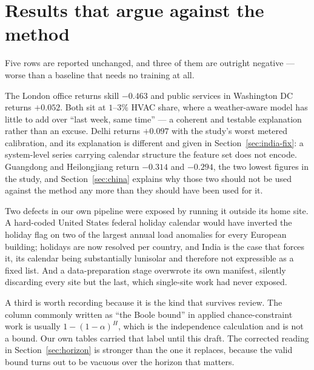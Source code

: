 \section{Results that argue against the method}
\label{sec:against}

Five rows are reported unchanged, and three of them are outright negative ---
worse than a baseline that needs no training at all.

The London office returns skill $-0.463$ and public services in Washington DC
returns $+0.052$. Both sit at $1$--$3\%$ HVAC share, where a weather-aware model
has little to add over ``last week, same time'' --- a coherent and testable
explanation rather than an excuse. Delhi returns $+0.097$ with the study's worst
metered calibration, and its explanation is different and given in
Section~\ref{sec:india-fix}: a system-level series carrying calendar structure
the feature set does not encode. Guangdong and Heilongjiang return $-0.314$ and
$-0.294$, the two lowest figures in the study, and Section~\ref{sec:china}
explains why those two should not be used against the method any more than they
should have been used for it.

Two defects in our own pipeline were exposed by running it outside its home
site. A hard-coded United States federal holiday calendar would have inverted
the holiday flag on two of the largest annual load anomalies for every European
building; holidays are now resolved per country, and India is the case that
forces it, its calendar being substantially lunisolar and therefore not
expressible as a fixed list. And a data-preparation stage overwrote its own
manifest, silently discarding every site but the last, which single-site work
had never exposed.

A third is worth recording because it is the kind that survives review. The
column commonly written as ``the Boole bound'' in applied chance-constraint work
is usually $1-(1-\alpha)^H$, which is the independence calculation and is not a
bound. Our own tables carried that label until this draft. The corrected reading
in Section~\ref{sec:horizon} is stronger than the one it replaces, because the
valid bound turns out to be vacuous over the horizon that matters.
